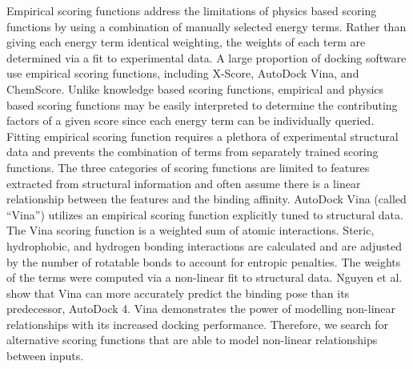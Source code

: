 \documentclass[linenumbers,doublespacing]{bmcart}
\begin{document}
Empirical scoring functions address the limitations of physics based scoring functions by using a combination of manually selected energy terms. Rather than giving each energy term identical weighting, the weights of each term are determined via a fit to experimental data. A large proportion of docking software use empirical scoring functions, including X-Score, AutoDock Vina, and ChemScore\cite{wang2002further,trott2010autodock,eldridge1997empirical}. Unlike knowledge based scoring functions, empirical and physics based scoring functions may be easily interpreted to determine the contributing factors of a given score since each energy term can be individually queried. Fitting empirical scoring function requires a plethora of experimental structural data and prevents the combination of terms from separately trained scoring functions. The three categories of scoring functions are limited to features extracted from structural information and often assume there is a linear relationship between the features and the binding affinity. AutoDock Vina (called ``Vina'') utilizes an empirical scoring function explicitly tuned to structural data\cite{trott2010autodock}. The Vina scoring function is a weighted sum of atomic interactions.  Steric, hydrophobic, and hydrogen bonding interactions are calculated and are adjusted by the number of rotatable bonds to account for entropic penalties. The weights of the terms were computed via a non-linear fit to structural data. Nguyen et al.\cite{nguyen2019autodock} show that Vina can more accurately predict the binding pose than its predecessor, AutoDock 4\cite{morris1998automated}. Vina demonstrates the power of modelling non-linear relationships with its increased docking performance. Therefore, we search for alternative scoring functions that are able to model non-linear relationships between inputs.
\end{document}
